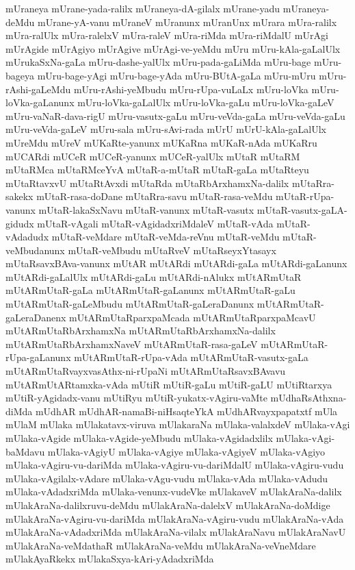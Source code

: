 {mUraneya
mUrane-yada-ralilx
mUraneya-dA-gilalx
mUrane-yadu
mUraneya-deMdu
mUrane-yA-vanu
mUraneV
mUranunx
mUranUnx
mUrara
mUra-ralilx
mUra-ralUlx
mUra-ralelxV
mUra-raleV
mUra-riMda
mUra-riMdalU
mUrAgi
mUrAgide
mUrAgiyo
mUrAgive
mUrAgi-ve-yeMdu
mUru
mUru-kAla-gaLalUlx
mUrukaSxNa-gaLa
mUru-dashe-yalUlx
mUru-pada-gaLiMda
mUru-bage
mUru-bageya
mUru-bage-yAgi
mUru-bage-yAda
mUru-BUtA-gaLa
mUru-mUru
mUru-rAshi-gaLeMdu
mUru-rAshi-yeMbudu
mUru-rUpa-vuLaLx
mUru-loVka
mUru-loVka-gaLanunx
mUru-loVka-gaLalUlx
mUru-loVka-gaLu
mUru-loVka-gaLeV
mUru-vaNaR-dava-rigU
mUru-vasutx-gaLu
mUru-veVda-gaLa
mUru-veVda-gaLu
mUru-veVda-gaLeV
mUru-sala
mUru-sAvi-rada
mUrU
mUrU-kAla-gaLalUlx
mUreMdu
mUreV
mUKaRte-yanunx
mUKaRna
mUKaR-nAda
mUKaRru
mUCARdi
mUCeR
mUCeR-yanunx
mUCeR-yalUlx
mUtaR
mUtaRM
mUtaRMca
mUtaRMceYvA
mUtaR-a-mUtaR
mUtaR-gaLa
mUtaRteyu
mUtaRtavxvU
mUtaRtAvxdi
mUtaRda
mUtaRbArxhamxNa-dalilx
mUtaRra-sakekx
mUtaR-rasa-doDane
mUtaRra-savu
mUtaR-rasa-veMdu
mUtaR-rUpa-vanunx
mUtaR-lakaSxNavu
mUtaR-vanunx
mUtaR-vasutx
mUtaR-vasutx-gaLA-gidudx
mUtaR-vAgali
mUtaR-vAgidadxriMdaleV
mUtaR-vAda
mUtaR-vAdadudx
mUtaR-veMdare
mUtaR-veMda-reVnu
mUtaR-veMdu
mUtaR-veMbudanunx
mUtaR-veMbudu
mUtaRveV
mUtaRseyxYtasayx
mUtaRsavxBAva-vanunx
mUtAR
mUtARdi
mUtARdi-gaLa
mUtARdi-gaLanunx
mUtARdi-gaLalUlx
mUtARdi-gaLu
mUtARdi-nAlukx
mUtARmUtaR
mUtARmUtaR-gaLa
mUtARmUtaR-gaLanunx
mUtARmUtaR-gaLu
mUtARmUtaR-gaLeMbudu
mUtARmUtaR-gaLeraDanunx
mUtARmUtaR-gaLeraDanenx
mUtARmUtaRparxpaMcada
mUtARmUtaRparxpaMcavU
mUtARmUtaRbArxhamxNa
mUtARmUtaRbArxhamxNa-dalilx
mUtARmUtaRbArxhamxNaveV
mUtARmUtaR-rasa-gaLeV
mUtARmUtaR-rUpa-gaLanunx
mUtARmUtaR-rUpa-vAda
mUtARmUtaR-vasutx-gaLa
mUtARmUtaRvayxvasAthx-ni-rUpaNi
mUtARmUtaRsavxBAvavu
mUtARmUtARtamxka-vAda
mUtiR
mUtiR-gaLu
mUtiR-gaLU
mUtiRtarxya
mUtiR-yAgidadx-vanu
mUtiRyu
mUtiR-yukatx-vAgiru-vaMte
mUdhaRsAthxna-diMda
mUdhAR
mUdhAR-namaBi-niHsaqteYkA
mUdhARvayxpapatxtf
mUla
mUlaM
mUlaka
mUlakatavx-viruva
mUlakaraNa
mUlaka-valalxdeV
mUlaka-vAgi
mUlaka-vAgide
mUlaka-vAgide-yeMbudu
mUlaka-vAgidadxlilx
mUlaka-vAgi-baMdavu
mUlaka-vAgiyU
mUlaka-vAgiye
mUlaka-vAgiyeV
mUlaka-vAgiyo
mUlaka-vAgiru-vu-dariMda
mUlaka-vAgiru-vu-dariMdalU
mUlaka-vAgiru-vudu
mUlaka-vAgilalx-vAdare
mUlaka-vAgu-vudu
mUlaka-vAda
mUlaka-vAdudu
mUlaka-vAdadxriMda
mUlaka-venunx-vudeVke
mUlakaveV
mUlakAraNa-dalilx
mUlakAraNa-dalilxruvu-deMdu
mUlakAraNa-dalelxV
mUlakAraNa-doMdige
mUlakAraNa-vAgiru-vu-dariMda
mUlakAraNa-vAgiru-vudu
mUlakAraNa-vAda
mUlakAraNa-vAdadxriMda
mUlakAraNa-vilalx
mUlakAraNavu
mUlakAraNavU
mUlakAraNa-veMdathaR
mUlakAraNa-veMdu
mUlakAraNa-veVneMdare
mUlakAyaRkekx
mUlakaSxya-kAri-yAdadxriMda
}
